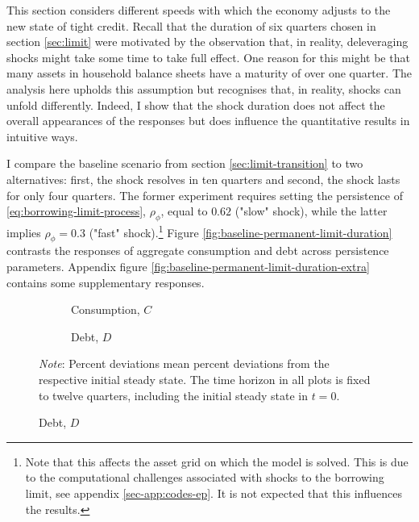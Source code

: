 \documentclass[a4paper,12pt]{article} %
\numberwithin{equation}{section} %
\numberwithin{figure}{section}
\numberwithin{table}{section}
\begin{document}
This section considers different speeds with which the economy adjusts to the new state of tight credit. Recall that the duration of six quarters chosen in section \ref{sec:limit} were motivated by the observation that, in reality, deleveraging shocks might take some time to take full effect. One reason for this might be that many assets in household balance sheets have a maturity of over one quarter. The analysis here upholds this assumption but recognises that, in reality, shocks can unfold differently. Indeed, I show that the shock duration does not affect the overall appearances of the responses but does influence the quantitative results in intuitive ways.


I compare the baseline scenario from section \ref{sec:limit-transition} to two alternatives: first, the shock resolves in ten quarters and second, the shock lasts for only four quarters. The former experiment requires setting the persistence of \eqref{eq:borrowing-limit-process}, $\rho_{\phi}$, equal to $0.62$ ("slow" shock), while the latter implies $\rho_{\phi} = 0.3$ ("fast" shock).\footnote{Note that this affects the asset grid on which the model is solved. This is due to the computational challenges associated with shocks to the borrowing limit, see appendix \ref{sec-app:codes-ep}. It is not expected that this influences the results.} Figure \ref{fig:baseline-permanent-limit-duration} contrasts the responses of aggregate consumption and debt across persistence parameters. Appendix figure \ref{fig:baseline-permanent-limit-duration-extra} contains some supplementary responses.

\begin{figure}[t]
    \centering
    \caption{Baseline Model -- Varying Durations of a Credit Crunch}
    \label{fig:baseline-permanent-limit-duration}
     \begin{subfigure}[b]{0.49\textwidth}
     \caption{Consumption, $C$}
     \label{fig:baseline-permanent-limit-duration-C}
         \centering
         
     \end{subfigure}
     \hfill
     \begin{subfigure}[b]{0.49\textwidth}
     \caption{Debt, $D$}
     \label{fig:baseline-permanent-limit-duration-D}
         \centering
         
     \end{subfigure}

    \vspace{10pt}
     
     \justifying
     \footnotesize
	\textit{Note}: Percent deviations mean percent deviations from the respective initial steady state. The time horizon in all plots is fixed to twelve quarters, including the initial steady state in $t=0$.
\end{figure}
\end{document}
